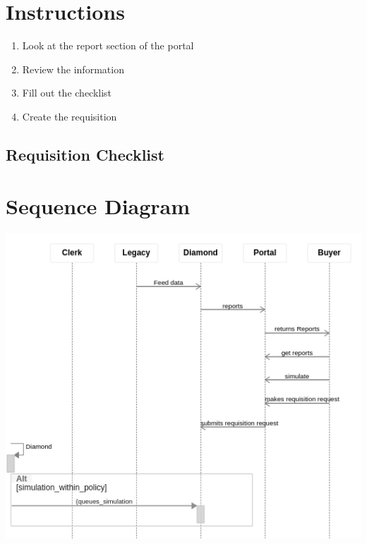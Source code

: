 \documentclass[letterpaper,10pt,english]{sphinxmanual}
\begin{document}
\begin{DUlineblock}{0em}
\item[] 
\end{DUlineblock}


\section{Instructions}
\label{Portal/750-Requisitions:id1}\begin{enumerate}
\item {} 
Look at the report section of the portal

\item {} 
Review the information

\item {} 
Fill out the checklist

\item {} 
Create the requisition

\end{enumerate}


\subsection{Requisition Checklist}
\label{Portal/750-Requisitions:id2}

\section{Sequence Diagram}
\label{Portal/750-Requisitions:id3}
\includegraphics{Requisitions.png}
\end{document}
